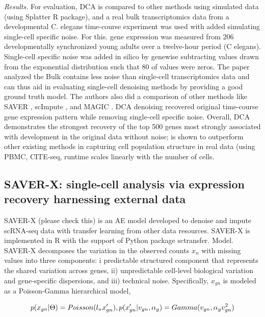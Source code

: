 \documentclass[
]{book}
\begin{document}
\emph{Results.} For evaluation, DCA is compared to other methods using simulated data (using Splatter R package), and a real bulk transcriptomics data from a developmental C. elegans time-course experiment was used with added simulating single-cell specific noise. For this. gene expression was measured from 206 developmentally synchronized young adults over a twelve-hour period (C elegans). Single-cell specific noise was added in silico by genewise subtracting values drawn from the exponential distribution such that 80\(%
\) of values were zeros. The paper analyzed the Bulk contains less noise than single-cell transcriptomics data and can thus aid in evaluating single-cell denoising methods by providing a good ground truth model. The authors also did a comparison of other methods like SAVER \citep{RN30}, scImpute \citep{RN31}, and MAGIC \citep{RN111}. DCA denoising recovered original time-course gene expression pattern while removing single-cell specific noise. Overall, DCA demonstrates the strongest recovery of the top 500 genes most strongly associated with development in the original data without noise; is shown to outperform other existing methods in capturing cell population structure in real data (using PBMC, CITE-seq, runtime scales linearly with the number of cells.

\hypertarget{ch-5-1-2}{%
\subsection{SAVER-X: single-cell analysis via expression recovery harnessing external data}\label{ch-5-1-2}}

SAVER-X \citep{RN204} (please check this) is an AE model developed to denoise and impute scRNA-seq data with transfer learning from other data resources. SAVER-X is implemented in R with the support of Python package sctransfer.
Model. SAVER-X decomposes the variation in the observed counts \(x_{n}\) with missing values into three components: i predictable structured component that represents the shared variation across genes, ii) unpredictable cell-level biological variation and gene-specific dispersions, and iii) technical noise. Specifically, \(x_{gn}\) is modeled as a Poisson-Gamma hierarchical model,

\begin{equation}
p(x_{gn}\vert \Theta)=Poisson(l_{n}x'_{gn}), \space \space p(x'_{gn}\vert v_{gn},\alpha_{g})=Gamma(v_{gn},\alpha_{g}v_{gn}^{2}) \label{eq:eq14}
\end{equation}
\end{document}
